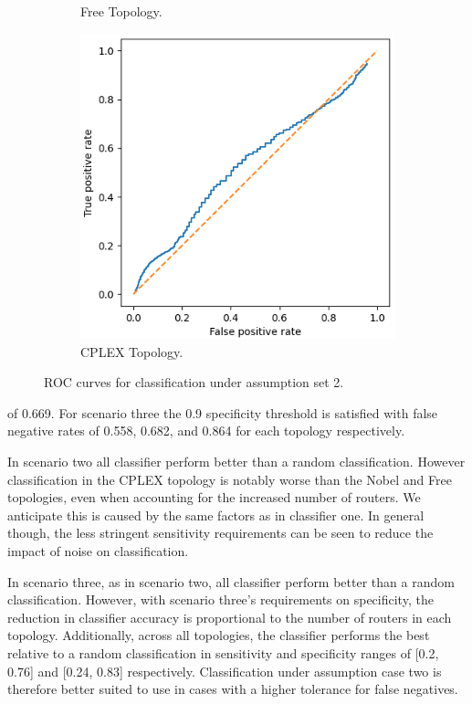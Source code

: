 \begin{figure}[H]
\begin{subfigure}{0.475\textwidth}
        \caption{Free Topology.}
    \end{subfigure}
    \begin{subfigure}{0.475\textwidth}
        \includegraphics[width=\textwidth]{figs/results/norway_case2_roc.png}
        \caption{CPLEX Topology.}
    \end{subfigure}
    \caption{ROC curves for classification under assumption set 2.}
    \label{fig:RA2ROCcurves}
\end{figure}
of 0.669. For scenario three the 0.9 specificity threshold is satisfied with false negative rates of 0.558, 0.682, and 0.864 for each topology respectively.\par
In scenario two all classifier perform better than a random classification. However classification in the CPLEX topology is notably worse than the Nobel and Free topologies, even when accounting for the increased number of routers. We anticipate this is caused by the same factors as in classifier one. In general though, the less stringent sensitivity requirements can be seen to reduce the impact of noise on classification.\par
In scenario three, as in scenario two, all classifier perform better than a random classification. However, with scenario three's requirements on specificity, the reduction in classifier accuracy is proportional to the number of routers in each topology. Additionally, across all topologies, the classifier performs the best relative to a random classification in sensitivity and specificity ranges of [0.2, 0.76] and [0.24, 0.83] respectively. Classification under assumption case two is therefore better suited to use in cases with a higher tolerance for false negatives.\par
